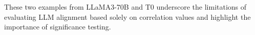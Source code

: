 
These two examples from LLaMA3-70B and T0 underscore the limitations of evaluating LLM alignment based solely on correlation values and highlight the importance of significance testing.


